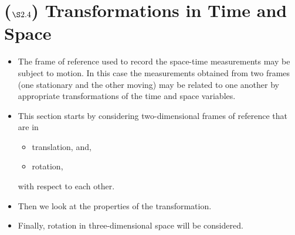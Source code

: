 \documentclass[11pt]{article}
\begin{document}
\section*{(\(\S 2.4\)) Transformations in Time and Space}
\label{sec:org970859e}
\begin{itemize}
\item The frame of reference used to record the space-time measurements may be subject to motion. In this case the measurements obtained from two frames (one stationary and the other moving) may be related to one another by appropriate transformations of the time and space variables.
\item This section starts by considering two-dimensional frames of reference that are in
\begin{itemize}
\item translation, and,
\item rotation,
\end{itemize}
with respect to each other.
\item Then we look at the properties of the transformation.
\item Finally, rotation in three-dimensional space will be considered.
\end{itemize}
\end{document}
